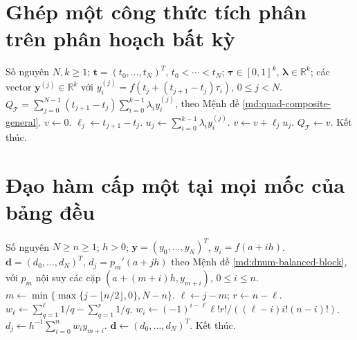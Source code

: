 \documentclass[12pt,a4paper,oneside]{book}
\numberwithin{algorithm}{chapter}
\theoremstyle{definition}
\newcommand{\R}{\mathbb{R}}
\begin{document}
\section{Ghép một công thức tích phân trên phân hoạch bất kỳ}
\begin{algorithm}[H]
\caption{Tính công thức tích phân ghép từ vector trọng số}
\label{alg:quad-general-composite}
\begin{algorithmic}[1]
\Require Số nguyên $N,k\geq1$; $\boldsymbol t=(t_0,\ldots,t_N)^T$, $t_0<\cdots<t_N$; $\boldsymbol\tau\in[0,1]^k$, $\boldsymbol\lambda\in\R^k$; các vector $\boldsymbol y^{(j)}\in\R^k$ với $y_i^{(j)}=f(t_j+(t_{j+1}-t_j)\tau_i)$, $0\leq j<N$.
\Ensure $Q_{\mathcal T}=\sum_{j=0}^{N-1}(t_{j+1}-t_j)\sum_{i=0}^{k-1}\lambda_i y_i^{(j)}$, theo Mệnh đề \ref{md:quad-composite-general}.
\State $v\gets0$.
  \State $\ell_j\gets t_{j+1}-t_j$.
  \State $u_j\gets\sum_{i=0}^{k-1}\lambda_i y_i^{(j)}$.
  \State $v\gets v+\ell_j u_j$.
\EndFor
\Statex
\State $Q_{\mathcal T}\gets v$.
\State Kết thúc.
\end{algorithmic}
\end{algorithm}

\section{Đạo hàm cấp một tại mọi mốc của bảng đều}
\begin{algorithm}[H]
\caption{Tính đạo hàm cấp một từ các khối $n+1$ mốc}
\label{alg:dnum-table-first}
\begin{algorithmic}[1]
\Require Số nguyên $N\geq n\geq1$; $h>0$; $\boldsymbol y=(y_0,\ldots,y_N)^T$, $y_i=f(a+ih)$.
\Ensure $\boldsymbol d=(d_0,\ldots,d_N)^T$, $d_j=p_m'(a+jh)$ theo Mệnh đề \ref{md:dnum-balanced-block}, với $p_m$ nội suy các cặp $(a+(m+i)h,y_{m+i})$, $0\leq i\leq n$.
  \State $m\gets\min\{\max\{j-\lfloor n/2\rfloor,0\},N-n\}$.
  \State $\ell\gets j-m$; $r\gets n-\ell$.
  \State $w_\ell\gets\sum_{q=1}^{\ell}1/q-\sum_{q=1}^r1/q$.
      \State $w_i\gets(-1)^{i-\ell}\ell!r!/((\ell-i)i!(n-i)!)$.
    \EndIf
  \EndFor
  \Statex
  \State $d_j\gets h^{-1}\sum_{i=0}^nw_i y_{m+i}$.
\EndFor
\Statex
\State $\boldsymbol d\gets(d_0,\ldots,d_N)^T$.
\State Kết thúc.
\end{algorithmic}
\end{algorithm}

\end{document}
